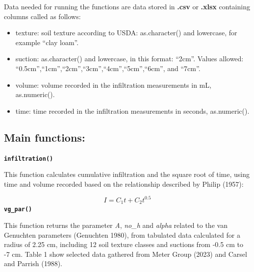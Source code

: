 \documentclass[
]{article}
\providecommand{\tightlist}{%
  \setlength{\itemsep}{0pt}\setlength{\parskip}{0pt}}\usepackage{longtable,booktabs,array}
\begin{document}
Data needed for running the functions are data stored in \textbf{.csv}
or \textbf{.xlsx} containing columns called as follows:

\begin{itemize}
\tightlist
\item
  texture: soil texture according to USDA: as.character() and lowercase,
  for example ``clay loam''.
\item
  suction: as.character() and lowercase, in this format: ``2cm''. Values
  allowed: ``0.5cm'',``1cm'',``2cm'',``3cm'',``4cm'',``5cm'',``6cm'',
  and ``7cm''.
\item
  volume: volume recorded in the infiltration measurements in mL,
  as.numeric().
\item
  time: time recorded in the infiltration measurements in seconds,
  as.numeric().
\end{itemize}

\newpage{}

\hypertarget{main-functions}{%
\subsection{Main functions:}\label{main-functions}}

\textbf{\texttt{infiltration()}}

This function calculates cumulative infiltration and the square root of
time, using time and volume recorded based on the relationship described
by Philip (1957):

\[I = C_{1} t + C_{2} t^{0.5} \] \textbf{\texttt{vg\_par()}}

This function returns the parameter \emph{A}, \emph{no\_h} and
\emph{alpha} related to the van Genuchten parameters (Genuchten 1980),
from tabulated data calculated for a radius of 2.25 cm, including 12
soil texture classes and suctions from -0.5 cm to -7 cm. Table 1 show
selected data gathered from Meter Group (2023) and Carsel and Parrish
(1988).
\end{document}
